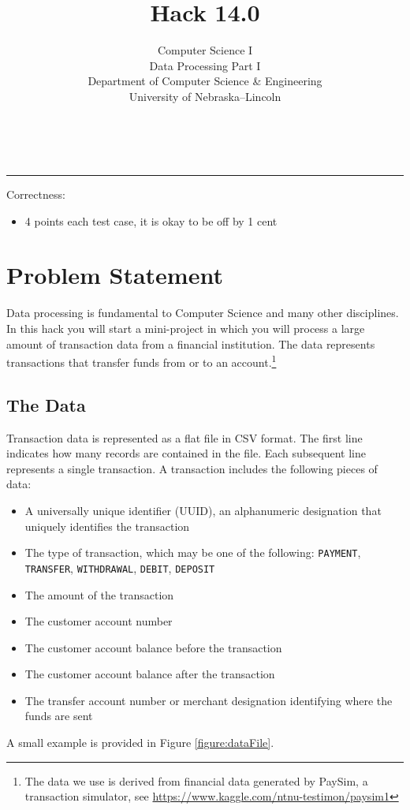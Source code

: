 \documentclass[12pt]{scrartcl}
\title{Hack 14.0}\let\Title\@title
\subtitle{Computer Science I\\
Data Processing Part I\\
{\small
\vskip1cm
Department of Computer Science \& Engineering \\
University of Nebraska--Lincoln}
\vskip-3cm}
\date{~}
\begin{document}
\maketitle

\hrule



Correctness:
\begin{itemize}
  \item 4 points each test case, it is okay to be off by 1 cent
\end{itemize}


\section*{Problem Statement}


Data processing is fundamental to Computer Science and many other disciplines.
In this hack you will start a mini-project in which you will process a large 
amount of transaction data from a financial institution.  The data represents 
transactions that transfer funds from or to an account.\footnote{The data we 
use is derived from financial data generated by PaySim, a transaction 
simulator, see \url{https://www.kaggle.com/ntnu-testimon/paysim1}}


\subsection*{The Data}

Transaction data is represented as a flat file in CSV format.  The first line
indicates how many records are contained in the file.  Each subsequent line 
represents a single transaction.  A transaction includes the following pieces
of data:
\begin{itemize}
  \item A universally unique identifier (UUID), an alphanumeric designation 
    that uniquely identifies the transaction
  \item The type of transaction, which may be one of the following:
    \texttt{PAYMENT}, \texttt{TRANSFER}, \texttt{WITHDRAWAL}, 
    \texttt{DEBIT}, \texttt{DEPOSIT}
  \item The amount of the transaction
  \item The customer account number
  \item The customer account balance before the transaction
  \item The customer account balance after the transaction
  \item The transfer account number or merchant designation identifying where the funds are sent 
\end{itemize}
A small example is provided in Figure \ref{figure:dataFile}.
\end{document}
